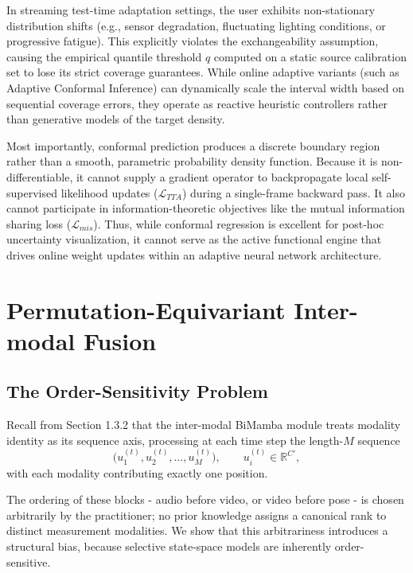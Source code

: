 \documentclass[11pt,a4paper]{article}
\newcommand{\R}{\mathbb{R}}
\begin{document}
	In streaming test-time adaptation settings, the user exhibits non-stationary distribution shifts (e.g., sensor degradation, fluctuating lighting conditions, or progressive fatigue). This explicitly violates the exchangeability assumption, causing the empirical quantile threshold $q$ computed on a static source calibration set to lose its strict coverage guarantees. While online adaptive variants (such as Adaptive Conformal Inference) \cite{gibbs2021} can dynamically scale the interval width based on sequential coverage errors, they operate as reactive heuristic controllers rather than generative models of the target density.
	
	Most importantly, conformal prediction produces a discrete boundary region rather than a smooth, parametric probability density function. Because it is non-differentiable, it cannot supply a gradient operator to backpropagate local self-supervised likelihood updates ($\mathcal{L}_{TTA}$) during a single-frame backward pass. It also cannot participate in information-theoretic objectives like the mutual information sharing loss ($\mathcal{L}_{mis}$). Thus, while conformal regression is excellent for post-hoc uncertainty visualization, it cannot serve as the active functional engine that drives online weight updates within an adaptive neural network architecture.
	
	\section{Permutation-Equivariant Inter-modal Fusion}
	
	\subsection{The Order-Sensitivity Problem}
	
	Recall from Section 1.3.2 that the inter-modal BiMamba module treats modality identity as its sequence axis, processing at each time step the length-$M$ sequence $$\bigl(u_1^{(t)}, u_2^{(t)}, \dots, u_M^{(t)}\bigr), \qquad u_i^{(t)} \in \R^{C'},$$ with each modality contributing exactly one position.

	The ordering of these blocks - audio before video, or video before pose - is chosen arbitrarily by the practitioner; no prior knowledge assigns a canonical rank to distinct measurement modalities. We show that this arbitrariness introduces a structural bias, because selective state-space models are inherently order-sensitive.
	
\end{document}
